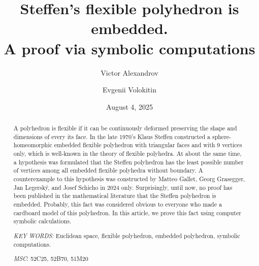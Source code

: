 \documentclass[12pt, reqno]{amsart}
\begin{document}
\title{Steffen's flexible polyhedron is embedded. \\
A proof via symbolic computations}
\author{Victor Alexandrov}
\address{Sobolev Institute of Mathematics, Novosibirsk, Russia and 
Department of Physics, Novosibirsk State University, Novosibirsk, Russia}
\author{Evgenii Volokitin}
\address{Sobolev Institute of Mathematics, Novosibirsk, Russia and 
Department of Physics, Novosibirsk State University, Novosibirsk, Russia}
\date{August 4, 2025}

\begin{abstract} 
A polyhedron is flexible if it can be continuously deformed preserving the shape 
and  dimensions of every its face. 
In the late 1970's Klaus Steffen constructed a sphere-homeomorphic embedded 
flexible polyhedron with triangular faces and with 9 vertices only,
which is well-known in the theory of flexible polyhedra.
At about the same time, a hypothesis was formulated that the Steffen polyhedron 
has the least possible number of vertices among all embedded flexible 
polyhedra without boundary. 
A counterexample to this hypothesis was constructed by Matteo Gallet, Georg Grasegger,
Jan Legersk{\'y}, and Josef Schicho in 2024 only.
Surprisingly, until now, no proof has been published in the mathematical literature 
that the Steffen polyhedron is embedded.
Probably, this fact was considered obvious to everyone who made a cardboard model 
of this polyhedron.
In this article, we prove this fact using computer symbolic calculations.
\par
\textit{KEY WORDS:} Euclidean space, flexible polyhedron, embedded polyhedron, 
symbolic computations.
\par
\textit{MSC}: 52C25, 52B70, 51M20
\end{abstract}
\maketitle
\end{document}

